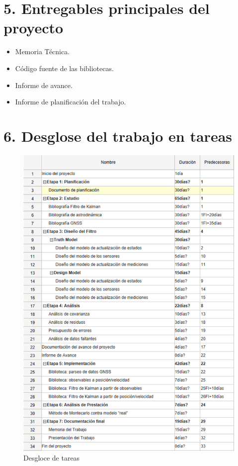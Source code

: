 \documentclass[11pt]{charter}
\begin{document}
\section{5. Entregables principales del proyecto}
\label{sec:entregables}

\begin{itemize}
\item Memoria Técnica.
\item Código fuente de las bibliotecas.
\item Informe de avance.
\item Informe de planificación del trabajo.
\end{itemize}

\section{6. Desglose del trabajo en tareas}
\label{sec:wbs}

\vspace{25px}

\begin{figure}[H]
\centering 
\includegraphics[width=.7\textwidth]{./Figuras/WBS.pdf}
\caption{Desgloce de tareas}
\label{fig:wbs}
\end{figure}

\vspace{25px}
\end{document}
